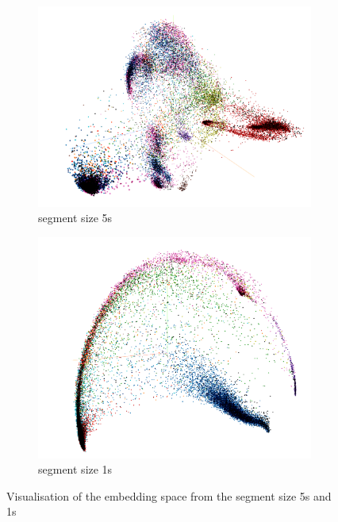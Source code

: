 \begin{figure}[htb]
\centering
\begin{subfigure}{.5\linewidth}
  \centering
  \includegraphics[width=.6\linewidth]{study-doc/experiment_tile_size/assets/embedding_space_5s.png}
  \caption{segment size 5s}
  \label{fig:embedding-5s}
\end{subfigure}%
\begin{subfigure}{.5\linewidth}
  \centering
  \includegraphics[width=.6\linewidth]{study-doc/experiment_tile_size/assets/embedding_space_1s.png}
  \caption{segment size 1s}
  \label{fig:embedding-1s}
\end{subfigure}
\caption{Visualisation of the embedding space from the segment size 5s and 1s}
\label{fig:tile-size-experiment-embedding-space}
\end{figure}


